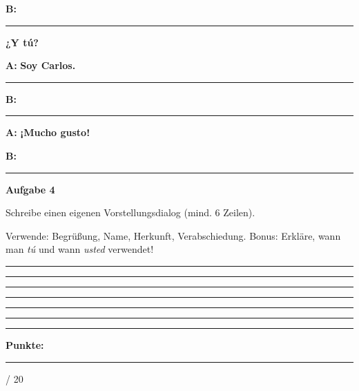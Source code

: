 \documentclass[11pt, a4paper]{article}
\newcommand{\fachfarbe}{spanisch}
\newcommand{\maxpunkte}{20}
\newcommand{\punktebox}[1]{\hfill\fbox{\small \_/#1}}
\newcommand{\luecke}[1]{\rule{#1}{0.4pt}}
\newcommand{\es}[1]{\textcolor{\fachfarbe}{\textbf{#1}}}
\newenvironment{aufgabe}[1]{%
    \needspace{5\baselineskip}%
    \nopagebreak[4]%
    \vspace{10pt}
    \noindent\textbf{\textcolor{\fachfarbe}{Aufgabe #1}}
    \nopagebreak[4]%
    \vspace{5pt}
    \nopagebreak[4]%
    \begin{list}{}{\leftmargin=0pt}
    \item[]
}{%
    \end{list}
}
\begin{document}
\textbf{B:} \luecke{6cm} \es{¿Y tú?}

\textbf{A:} \es{Soy Carlos.} \luecke{4cm}

\textbf{B:} \luecke{6cm}

\textbf{A:} \es{¡Mucho gusto!}

\textbf{B:} \luecke{4cm}

\vspace{15pt}


\begin{aufgabe}{4}
Schreibe einen eigenen Vorstellungsdialog (mind. 6 Zeilen). \punktebox{6}
\end{aufgabe}

\begin{hinweis}
Verwende: Begrüßung, Name, Herkunft, Verabschiedung. Bonus: Erkläre, wann man \textit{tú} und wann \textit{usted} verwendet!
\end{hinweis}

\noindent\rule{\textwidth}{0.4pt}\vspace{8pt}
\noindent\rule{\textwidth}{0.4pt}\vspace{8pt}
\noindent\rule{\textwidth}{0.4pt}\vspace{8pt}
\noindent\rule{\textwidth}{0.4pt}\vspace{8pt}
\noindent\rule{\textwidth}{0.4pt}\vspace{8pt}
\noindent\rule{\textwidth}{0.4pt}\vspace{8pt}

\vspace{20pt}
\hrule
\vspace{10pt}

\begin{flushright}
\textbf{Punkte:} \luecke{1cm} / \maxpunkte
\end{flushright}
\end{document}
